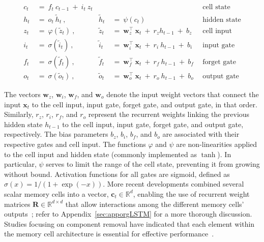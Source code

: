 \begin{align}
c_t \ &= \  f_t \ c_{t-1} \ + \ i_t \ z_t &  & &\text{cell state} \\
h_t  \ &= \ o_t \ \tilde{h}_t \ , & \tilde{h}_t \ &= \ \psi \left( c_t\right)
  &\text{hidden state} \\
z_t \ &= \ \varphi \left( \tilde{z}_t \right) \ , 
  &\tilde{z}_t \ &=  \ \mathbf{w}^\top_{z} \ \mathbf{x}_t \ + \
  r_{z}  h_{t-1} \ + \  b_{z} \ \
  &\text{cell input} \\
i_t \ &= \ \sigma \left( \tilde{i}_t  \right) \ , 
  &\tilde{i}_t \ &= \ \mathbf{w}^\top_{i} \ \mathbf{x}_t \ + \
  r_{i}  \ h_{t-1} \ + \  b_{i} \ \
  &\text{input gate} \\
f_t \ &= \ \sigma \left(  \tilde{f}_t \right) \ , 
  &\tilde{f}_t \ &= \ \mathbf{w}^\top_{f} \ \mathbf{x}_t  \ + \
  r_{f}  \ h_{t-1} \ + \  b_{f} \ \
  &\text{forget gate} \\
o_t \ &= \ \sigma \left( \tilde{o}_t \right) \ , 
  &\tilde{o}_t  \ &= \ \mathbf{w}^\top_{o} \ \mathbf{x}_t \ + \
  r_{o}  \ h_{t-1} \ + \  b_{o} \ \
  &\text{output gate} 
\end{align}

The vectors $\mathbf{w}_{z}$, $\mathbf{w}_{i}$, $\mathbf{w}_{f}$, and $\mathbf{w}_{o}$ denote the input weight vectors that connect the input $\mathbf{x}_t$ to the cell input, input gate, forget gate, and output gate, in that order. Similarly, $r_{z}$, $r_{i}$, $r_{f}$, and $r_{o}$ represent the recurrent weights linking the previous hidden state $h_{t-1}$ to the cell input, input gate, forget gate, and output gate, respectively. The bias parameters $b_{z}$, $b_{i}$, $b_{f}$, and $b_{o}$ are associated with their respective gates and cell input. The functions $\varphi$ and $\psi$ are non-linearities applied to the cell input and hidden state (commonly implemented as $\tanh$). In particular, $\psi$ serves to limit the range of the cell state, preventing it from growing without bound. Activation functions for all gates are sigmoid, defined as $\sigma \left( x \right) = 1/(1+\exp(-x))$. More recent developments combined several scalar memory cells into a vector, $\mathbf{c}_t \in \mathbb{R}^{d}$, enabling the use of recurrent weight matrices $\mathbf{R} \in \mathbb{R}^{d \times d}$ that allow interactions among the different memory cells' outputs~\citep{Greff:15}; refer to Appendix~\ref{sec:apporgLSTM} for a more thorough discussion. Studies focusing on component removal have indicated that each element within the memory cell architecture is essential for effective performance~\citep{Greff:15}.

